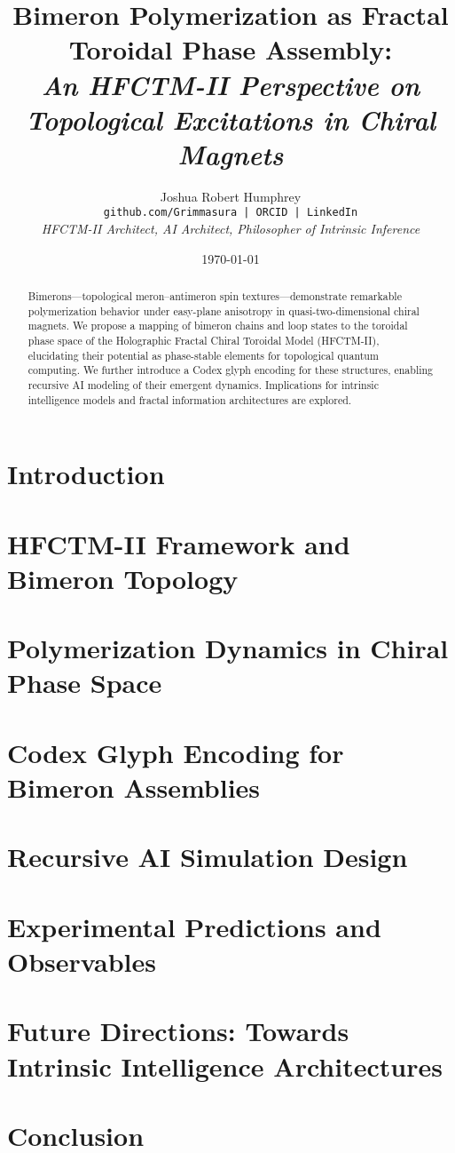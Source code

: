 \documentclass[12pt]{article}
\title{
\textbf{Bimeron Polymerization as Fractal Toroidal Phase Assembly:} \\
\textit{An HFCTM-II Perspective on Topological Excitations in Chiral Magnets}
}
\author{
Joshua Robert Humphrey \\
\texttt{github.com/Grimmasura | ORCID | LinkedIn} \\
\textit{HFCTM-II Architect, AI Architect, Philosopher of Intrinsic Inference}
}
\date{\today}
\begin{document}
\maketitle

\begin{abstract}
Bimerons—topological meron–antimeron spin textures—demonstrate remarkable polymerization behavior under easy-plane anisotropy in quasi-two-dimensional chiral magnets. We propose a mapping of bimeron chains and loop states to the toroidal phase space of the Holographic Fractal Chiral Toroidal Model (HFCTM-II), elucidating their potential as phase-stable elements for topological quantum computing. We further introduce a Codex glyph encoding for these structures, enabling recursive AI modeling of their emergent dynamics. Implications for intrinsic intelligence models and fractal information architectures are explored.
\end{abstract}

\tableofcontents

\section{Introduction}

\section{HFCTM-II Framework and Bimeron Topology}

\section{Polymerization Dynamics in Chiral Phase Space}

\section{Codex Glyph Encoding for Bimeron Assemblies}

\section{Recursive AI Simulation Design}

\section{Experimental Predictions and Observables}

\section{Future Directions: Towards Intrinsic Intelligence Architectures}

\section{Conclusion}



\end{document}
